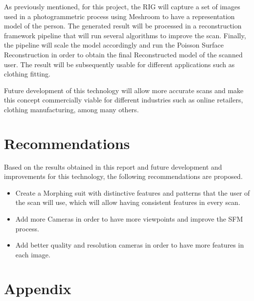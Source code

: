 \documentclass[12pt]{report}
\begin{document}
As previously mentioned, for this project, the RIG will capture a set of images used in a photogrammetric process using Meshroom to have a representation model of the person. 
The generated result will be processed in a reconstruction framework pipeline that will run several algorithms to improve the scan. 
Finally, the pipeline will scale the model accordingly and run the Poisson Surface Reconstruction in order to obtain the final Reconstructed model of the scanned user. 
The result will be subsequently usable for different applications such as clothing fitting. 

Future development of this technology will allow more accurate scans and make this concept commercially viable for different industries such as online retailers, clothing manufacturing, among many others.


\chapter{Recommendations}

Based on the results obtained in this report and future development and improvements for this technology, the following recommendations are proposed.

\begin{itemize}
  \item Create a Morphing suit with distinctive features and patterns that the user of the scan will use, which will allow having consistent features in every scan.
  \item Add more Cameras in order to have more viewpoints and improve the SFM process.
  \item Add better quality and resolution cameras in order to have more features in each image.
\end{itemize}




\nocite{*}   %




\appendix
\chapter{Appendix}\vspace{-5.5cm}



\end{document}
